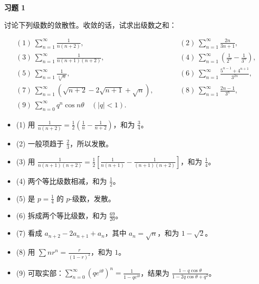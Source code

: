 \begin{exercisebox}
\textbf{习题 1 }

讨论下列级数的敛散性。收敛的话，试求出级数之和：

\[
      \begin{aligned}
      &(1)\ \sum_{n=1}^{\infty}\frac1{n(n+2)},\qquad
      &&(2)\ \sum_{n=1}^{\infty}\frac{2n}{3n+1},\\
      &(3)\ \sum_{n=1}^{\infty}\frac1{n(n+1)(n+2)},\qquad
      &&(4)\ \sum_{n=1}^{\infty}\left(\frac1{2^n}-\frac1{3^n}\right),\\
      &(5)\ \sum_{n=1}^{\infty}\frac1{\sqrt[4]{n}},\qquad
      &&(6)\ \sum_{n=1}^{\infty}\frac{5^{n-1}+4^{n+1}}{3^{2n}},\\
      &(7)\ \sum_{n=1}^{\infty}\left(\sqrt{n+2}-2\sqrt{n+1}+\sqrt n\right),\qquad
      &&(8)\ \sum_{n=1}^{\infty}\frac{2n-1}{3^n},\\
      &(9)\ \sum_{n=0}^{\infty}q^n\cos n\theta\quad (|q|<1).
      \end{aligned}
      \]

\begin{hintbox}
\begin{itemize}
 \item (1) 用 \(\displaystyle \frac1{n(n+2)}=\frac12\left(\frac1n-\frac1{n+2}\right)\)，和为 \(\frac34\)。
 \item (2) 一般项趋于 \(\frac23\)，所以发散。
 \item (3) 用 \(\displaystyle \frac1{n(n+1)(n+2)}=\frac12\left[\frac1{n(n+1)}-\frac1{(n+1)(n+2)}\right]\)，和为 \(\frac14\)。
 \item (4) 两个等比级数相减，和为 \(\frac12\)。
 \item (5) 是 \(p=\frac14\) 的 \(p\)-级数，发散。
 \item (6) 拆成两个等比级数，和为 \(\frac{69}{20}\)。
 \item (7) 看成 \(a_{n+2}-2a_{n+1}+a_n\)，其中 \(a_n=\sqrt n\)，和为 \(1-\sqrt2\)。
 \item (8) 用 \(\sum nr^n=\frac{r}{(1-r)^2}\)，和为 \(1\)。
 \item (9) 可取实部：\(\displaystyle \sum_{n=0}^{\infty}(qe^{i\theta})^n=\frac1{1-qe^{i\theta}}\)，结果为 \(\displaystyle \frac{1-q\cos\theta}{1-2q\cos\theta+q^2}\)。
 \end{itemize}
\end{hintbox}
\end{exercisebox}

